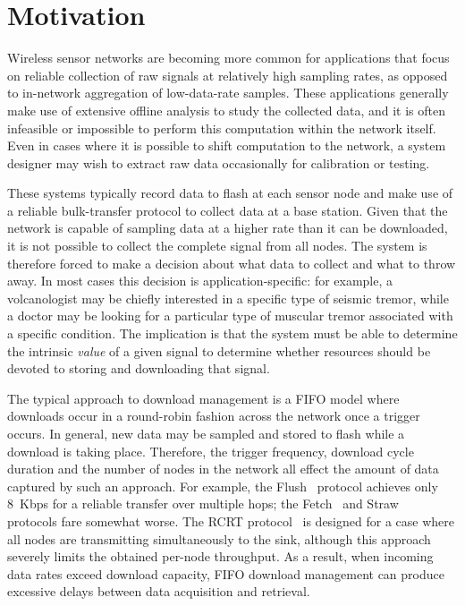\section{Motivation}
\label{lance-sec-motivation}

Wireless sensor networks are becoming more common for applications that focus
on reliable collection of raw signals at relatively high sampling rates, as
opposed to in-network aggregation of low-data-rate samples.  These
applications generally make use of extensive offline analysis to study the
collected data, and it is often infeasible or impossible to perform this
computation within the network itself.  Even in cases where it is possible to
shift computation to the network, a system designer may wish to extract raw
data occasionally for calibration or testing.

These systems typically record data to flash at each sensor node and make use
of a reliable bulk-transfer protocol to collect data at a base station. Given
that the network is capable of sampling data at a higher rate than it can be
downloaded, it is not possible to collect the complete signal from all nodes.
The system is therefore forced to make a decision about what data to collect
and what to throw away. In most cases this decision is application-specific:
for example, a volcanologist may be chiefly interested in a specific type of
seismic tremor, while a doctor may be looking for a particular type of
muscular tremor associated with a specific condition. The implication is that
the system must be able to determine the intrinsic \textit{value} of a given
signal to determine whether resources should be devoted to storing and
downloading that signal.

The typical approach to download management is a FIFO model where downloads
occur in a round-robin fashion across the network once a trigger occurs. In
general, new data may be sampled and stored to flash while a download is
taking place.  Therefore, the trigger frequency, download cycle duration and
the number of nodes in the network all effect the amount of data captured by
such an approach.  For example, the Flush~\cite{flush-sensys07} protocol
achieves only 8~Kbps for a reliable transfer over multiple hops; the
Fetch~\cite{volcano-osdi06} and Straw~\cite{ggb-ipsn07} protocols fare
somewhat worse. The RCRT protocol~\cite{rcrt-sensys07} is designed for a case
where all nodes are transmitting simultaneously to the sink, although this
approach severely limits the obtained per-node throughput. As a result, when
incoming data rates exceed download capacity, FIFO download management can
produce excessive delays between data acquisition and retrieval.

